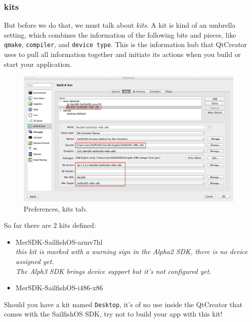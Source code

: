 \subsubsection{kits}\label{subsubsec:kits}
%
But before we do that, we must talk about \textit{kits}. A kit is kind of an umbrella setting, which combines the information of the following bits and pieces, like \verb,qmake,, \verb,compiler,, and \verb,device type,. This is the information hub that QtCreator uses to pull all information together and initiate its actions when you build or start your application.
%
\begin{figure}[H]
  \centering
  \includegraphics[scale=0.35]{../media/gfx/QtCreator/kits486.png} 
  \caption{Preferences, kits tab.}
  \label{fig:creatorkits}
\end{figure}
%
So far there are 2 kits defined:
\begin{itemize}
\item MerSDK-SailfishOS-armv7hl \\
		\emph{this kit is marked with a warning sign in the Alpha2 SDK, there is no device assigned yet.\\
		The Alph3 SDK brings device support but it's not configured yet.}
\item MerSDK-SailfishOS-i486-x86
\end{itemize}
%
Should you have a kit named \verb,Desktop,, it's of no use inside the QtCreator that comes with the SailfishOS SDK, try not to build your app with this kit!
%
